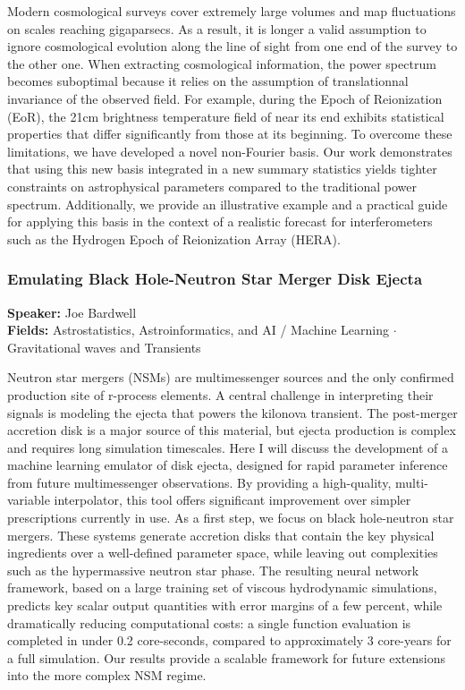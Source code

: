 Modern cosmological surveys cover extremely large volumes and map fluctuations on scales reaching gigaparsecs. As a result, it is longer a valid assumption to ignore cosmological evolution along the line of sight from one end of the survey to the other one. When extracting cosmological information, the power spectrum becomes suboptimal because it relies on the assumption of translationnal invariance of the observed field. For example, during the Epoch of Reionization (EoR), the 21cm brightness temperature field of near its end exhibits statistical properties that differ significantly from those at its beginning. To overcome these limitations, we have developed a novel non-Fourier basis. Our work demonstrates that using this new basis integrated in a new summary statistics yields tighter constraints on astrophysical parameters compared to the traditional power spectrum. Additionally, we provide an illustrative example and a practical guide for applying this basis in the context of a realistic forecast for interferometers such as the Hydrogen Epoch of Reionization Array (HERA).

\hypertarget{abstract-talk-xx2}{}\label{abstract-page-talk-xx2}
\subsubsection*{Emulating Black Hole-Neutron Star Merger Disk Ejecta}
\textbf{Speaker:} Joe Bardwell\\
\textbf{Fields:} Astrostatistics, Astroinformatics, and AI / Machine Learning $\cdot$ Gravitational waves and Transients

Neutron star mergers (NSMs) are multimessenger sources and the only confirmed production site of r-process elements. A central challenge in interpreting their signals is modeling the ejecta that powers the kilonova transient. The post-merger accretion disk is a major source of this material, but ejecta production is complex and requires long simulation timescales. Here I will discuss the development of a machine learning emulator of disk ejecta, designed for rapid parameter inference from future multimessenger observations. By providing a high-quality, multi-variable interpolator, this tool offers significant improvement over simpler prescriptions currently in use. As a first step, we focus on black hole-neutron star mergers. These systems generate accretion disks that contain the key physical ingredients over a well-defined parameter space, while leaving out complexities such as the hypermassive neutron star phase. The resulting neural network framework, based on a large training set of viscous hydrodynamic simulations, predicts key scalar output quantities with error margins of a few percent, while dramatically reducing computational costs: a single function evaluation is completed in under 0.2 core-seconds, compared to approximately 3 core-years for a full simulation. Our results provide a scalable framework for future extensions into the more complex NSM regime.

